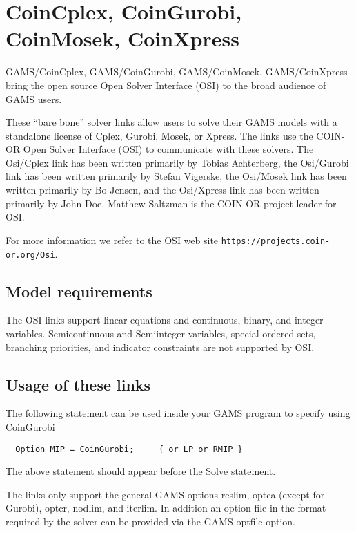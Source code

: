 \section{CoinCplex, CoinGurobi, CoinMosek, CoinXpress}

GAMS/CoinCplex, GAMS/CoinGurobi, GAMS/CoinMosek, GAMS/CoinXpress bring the open source Open Solver Interface (OSI) to the broad audience of GAMS users.

These ``bare bone'' solver links allow users to solve their GAMS models with a standalone license of Cplex, Gurobi, Mosek, or Xpress.
The links use the COIN-OR Open Solver Interface (OSI) to communicate with these solvers.
The Osi/Cplex link has been written primarily by Tobias Achterberg,
the Osi/Gurobi link has been written primarily by Stefan Vigerske,
the Osi/Mosek link has been written primarily by Bo Jensen, and
the Osi/Xpress link has been written primarily by John Doe.
Matthew Saltzman is the COIN-OR project leader for OSI.

For more information we refer to the OSI web site \texttt{https://projects.coin-or.org/Osi}.

\subsection{Model requirements}

The OSI links support linear equations and continuous, binary, and integer variables.
Semicontinuous and Semiinteger variables, special ordered sets, branching priorities, and indicator constraints are not supported by OSI.

\subsection{Usage of these links}

The following statement can be used inside your GAMS program to specify using CoinGurobi
\begin{verbatim}
  Option MIP = CoinGurobi;     { or LP or RMIP }
\end{verbatim}

The above statement should appear before the Solve statement.

The links only support the general GAMS options reslim, optca (except for Gurobi), optcr, nodlim, and iterlim.
In addition an option file in the format required by the solver can be provided via the GAMS optfile option.

\chapterend
